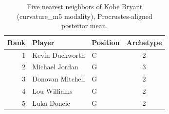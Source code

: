 \begin{table}[htbp]
  \centering\small
  \begin{tabular}{rllc}
    \toprule
    Rank & Player & Position & Archetype \\
    \midrule
    1 & Kevin Duckworth & C & 2 \\
    2 & Michael Jordan & G & 3 \\
    3 & Donovan Mitchell & G & 2 \\
    4 & Lou Williams & G & 2 \\
    5 & Luka Doncic & G & 2 \\
    \bottomrule
  \end{tabular}
  \caption{Five nearest neighbors of Kobe Bryant (curvature_m5 modality), Procrustes-aligned posterior mean.}
  \label{tab:Kobe_Bryant_neighbors_curvature_m5}
\end{table}


